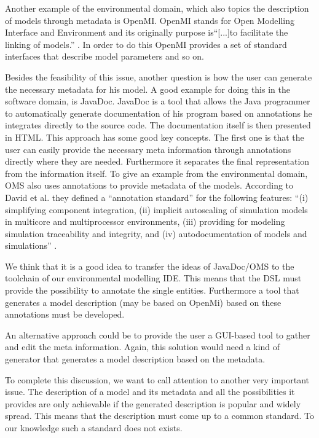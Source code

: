 Another example of the environmental domain, which also topics the description of models through metadata is OpenMI. OpenMI stands for Open Modelling Interface and Environment and its originally purpose is``[...]to facilitate the linking of models.'' \autocite[70]{adgeo-4-69-2005}. In order to do this OpenMI provides a set of standard interfaces that describe model parameters and so on.


Besides the feasibility of this issue, another question is how the user can generate the necessary metadata for his model. A good example for doing this in the software domain, is JavaDoc. JavaDoc is a tool that allows the Java programmer to automatically generate documentation of his program based on annotations he integrates directly to the source code. The documentation itself is then presented in HTML. This approach has some good key concepts. The first one is that the user can easily provide the necessary meta information through annotations directly where they are needed. Furthermore it separates the final representation from the information itself. To give an example from the environmental domain, OMS also uses annotations to provide metadata of the models. According to David et al. they defined a “annotation standard” for the following features: “(i) simplifying component integration, (ii) implicit autoscaling of simulation models in multicore and multiprocessor environments, (iii) providing for modeling simulation traceability and integrity, and (iv) autodocumentation of models and simulations'' \autocite[2]{dsl:oms-handbook}.


We think that it is a good idea to transfer the ideas of JavaDoc/OMS to the toolchain of our environmental modelling IDE. This means that the DSL must provide the possibility to annotate the single entities. Furthermore a tool that generates a model  description (may be based on OpenMi) based on these annotations must be developed.


An alternative approach could be to provide the user a GUI-based tool to gather and edit the meta information. Again, this solution would need a kind of generator that generates a model description based on the metadata.


To complete this discussion, we want to call attention to another very important issue. The description of a model and its metadata and all the possibilities it provides are only achievable if the generated description is popular and widely spread. This means that the description must come up to a common standard. To our knowledge such a standard does not exists.


